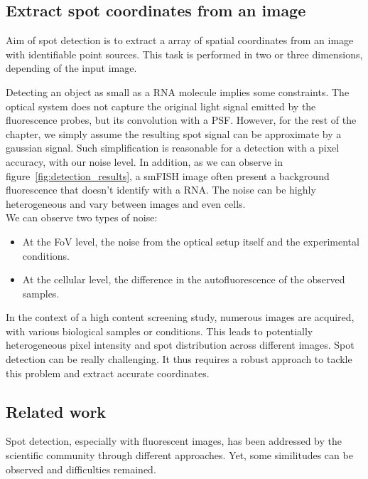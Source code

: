 \subsection{Extract spot coordinates from an image} \label{subsec:detection}

Aim of spot detection is to extract a array of spatial coordinates from an image with identifiable point sources.
This task is performed in two or three dimensions, depending of the input image.

Detecting an object as small as a \ac{RNA} molecule implies some constraints.
The optical system does not capture the original light signal emitted by the fluorescence probes, but its convolution with a \ac{PSF}.
However, for the rest of the chapter, we simply assume the resulting spot signal can be approximate by a gaussian signal.
Such simplification is reasonable for a detection with a pixel accuracy, with our noise level.
In addition, as we can observe in figure~\ref{fig:detection_results}, a \ac{smFISH} image often present a background fluorescence that doesn't identify with a \ac{RNA}.
The noise can be highly heterogeneous and vary between images and even cells.\\

\noindent
We can observe two types of noise:
\begin{itemize}
	\item At the \ac{FoV} level, the noise from the optical setup itself and the experimental conditions.
	\item At the cellular level, the difference in the autofluorescence of the observed samples.
\end{itemize}

In the context of a high content screening study, numerous images are acquired, with various biological samples or conditions.
This leads to potentially heterogeneous pixel intensity and spot distribution across different images.
Spot detection can be really challenging.
It thus requires a robust approach to tackle this problem and extract accurate coordinates.

\subsection{Related work} \label{subsec:detection_related_work}

Spot detection, especially with fluorescent images, has been addressed by the scientific community through different approaches.
Yet, some similitudes can be observed and difficulties remained.

